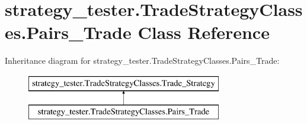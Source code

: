 \hypertarget{classstrategy__tester_1_1TradeStrategyClasses_1_1Pairs__Trade}{\section{strategy\-\_\-tester.\-Trade\-Strategy\-Classes.\-Pairs\-\_\-\-Trade \-Class \-Reference}
\label{classstrategy__tester_1_1TradeStrategyClasses_1_1Pairs__Trade}
}
\-Inheritance diagram for strategy\-\_\-tester.\-Trade\-Strategy\-Classes.\-Pairs\-\_\-\-Trade\-:\begin{figure}[H]
\begin{center}
\leavevmode
\includegraphics[height=2.000000cm]{classstrategy__tester_1_1TradeStrategyClasses_1_1Pairs__Trade}
\end{center}
\end{figure}
